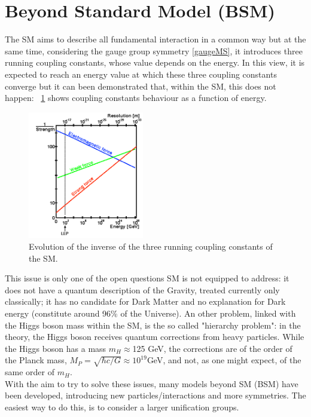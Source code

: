 \section{Beyond Standard Model (BSM)}
The SM aims to describe all fundamental interaction in a common way but at the same time, considering the gauge group symmetry \ref{gaugeMS}, it introduces three running coupling constants, whose value depends on the energy. In this view, it is expected to reach an energy value at which these three coupling constants converge but it can been demonstrated that, within the SM, this does not happen: \figurename~\ref{rccMS} shows coupling constants behaviour as a function of energy. 
\begin{figure}[htbp]
\centering
\includegraphics[width=0.45\textwidth]{Images/rccMS}
\caption{Evolution of the inverse of the three running coupling constants of the SM.}
\label{rccMS}
\end{figure}
This issue is only one of the open questions SM is not equipped to address: \eg it does not have a quantum description of the Gravity, treated currently only classically; it has no candidate for Dark Matter and no explanation for Dark energy (constitute around 96\% of the Universe). An other problem, linked with the Higgs boson mass within the SM, is the so called "hierarchy problem": in the theory, the Higgs boson receives quantum corrections from heavy particles. While the Higgs boson has a mass $m_H\approx$125 GeV, the corrections are of the order of the Planck mass, $M_P = \sqrt{\hbar c /G} \approx10^{19}$GeV, and not, as one might expect, of the same order of $m_H$. \\
With the aim to try to solve these issues, many models beyond SM (BSM) have been developed, introducing new particles/interactions and more symmetries. The easiest way to do this, is to consider a larger unification groups. \\

